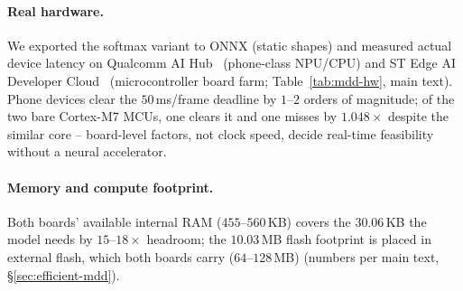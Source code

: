 ﻿\documentclass{article} %
\theoremstyle{remark}
\begin{document}
\begin{table}[t]
  \centering\small
  \caption{Fused AUROC ($W{=}64$, L5) as the RCF reference set and search are shrunk for
  embedded export (column definitions in the text above).}
  \label{tab:mdd-reduce}
\end{table}

\paragraph{Real hardware.} We exported the softmax variant to ONNX (static shapes) and measured
actual device latency on Qualcomm AI Hub~\citep{qualcommaihub} (phone-class NPU/CPU) and ST Edge AI
Developer Cloud~\citep{stedgeai} (microcontroller board farm; Table~\ref{tab:mdd-hw}, main text).
Phone devices clear the $50$\,ms/frame deadline by $1$--$2$ orders of magnitude; of the two bare
Cortex-M7 MCUs, one clears it and one misses by $1.048\times$ despite the similar core -- board-level
factors, not clock speed, decide real-time feasibility without a neural accelerator.

\paragraph{Memory and compute footprint.} Both boards' available internal RAM ($455$--$560$\,KB)
covers the $30.06$\,KB the model needs by $15$--$18\times$ headroom; the $10.03$\,MB flash footprint
is placed in external flash, which both boards carry ($64$--$128$\,MB) (numbers per main text,
\S\ref{sec:efficient-mdd}).
\end{document}
